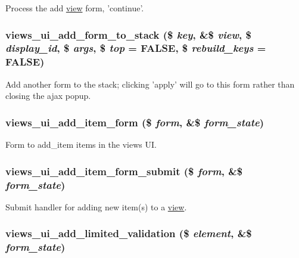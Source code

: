 \label{admin_8inc_ab93f3ab13bdb205a076d0d6d1ae95f9e}
Process the add \hyperlink{classview}{view} form, 'continue'. \hypertarget{admin_8inc_aae9aad849e9069d6a717bc78e0a468b0}{
\subsubsection[{views\_\-ui\_\-add\_\-form\_\-to\_\-stack}]{\setlength{\rightskip}{0pt plus 5cm}views\_\-ui\_\-add\_\-form\_\-to\_\-stack (\$ {\em key}, \/  \&\$ {\em view}, \/  \$ {\em display\_\-id}, \/  \$ {\em args}, \/  \$ {\em top} = {\ttfamily FALSE}, \/  \$ {\em rebuild\_\-keys} = {\ttfamily FALSE})}}
\label{admin_8inc_aae9aad849e9069d6a717bc78e0a468b0}
Add another form to the stack; clicking 'apply' will go to this form rather than closing the ajax popup. \hypertarget{admin_8inc_a60af2b1fd57c814bbae32de066b8b1d7}{
\subsubsection[{views\_\-ui\_\-add\_\-item\_\-form}]{\setlength{\rightskip}{0pt plus 5cm}views\_\-ui\_\-add\_\-item\_\-form (\$ {\em form}, \/  \&\$ {\em form\_\-state})}}
\label{admin_8inc_a60af2b1fd57c814bbae32de066b8b1d7}
Form to add\_\-item items in the views UI. \hypertarget{admin_8inc_ab9af88d70446a68c6fac8afe2bc4cffe}{
\subsubsection[{views\_\-ui\_\-add\_\-item\_\-form\_\-submit}]{\setlength{\rightskip}{0pt plus 5cm}views\_\-ui\_\-add\_\-item\_\-form\_\-submit (\$ {\em form}, \/  \&\$ {\em form\_\-state})}}
\label{admin_8inc_ab9af88d70446a68c6fac8afe2bc4cffe}
Submit handler for adding new item(s) to a \hyperlink{classview}{view}. \hypertarget{admin_8inc_a77ce1a8b53feb8ec8c024fa4eb8c18e3}{
\subsubsection[{views\_\-ui\_\-add\_\-limited\_\-validation}]{\setlength{\rightskip}{0pt plus 5cm}views\_\-ui\_\-add\_\-limited\_\-validation (\$ {\em element}, \/  \&\$ {\em form\_\-state})}}
